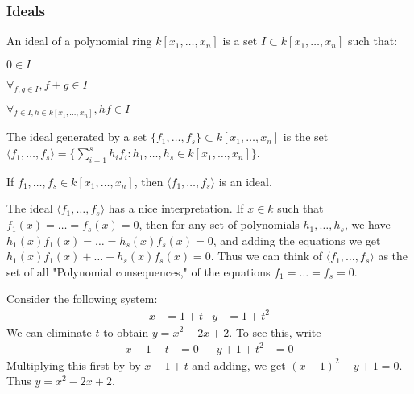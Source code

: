 \documentclass[crop=false,class=article,oneside]{standalone}
\begin{document}
    \subsubsection{Ideals}
    \begin{definition}
    An ideal of a polynomial ring $k[x_1,\hdots ,x_n]$ is a set $I\subset k[x_1,\hdots ,x_n]$ such that:
    \begin{enumerate}
    \begin{multicols}{3}
        \item $0\in I$
        \item $\forall_{f,g\in I}, f+g\in I$ 
        \item $\forall_{f\in I, h\in k[x_1,\hdots ,x_n]}, hf\in I$
    \end{multicols}
    \end{enumerate}
    \end{definition}
    \begin{definition}
    The ideal generated by a set $\{f_1,\hdots, f_s\} \subset k[x_1,\hdots ,x_n]$ is the set $\langle f_1,\hdots, f_s\rangle = \{\sum_{i=1}^{s} h_i f_i:h_1,\hdots, h_s\in k[x_1,\hdots ,x_n]\}$.
    \end{definition}
    \begin{theorem}
    If $f_1,\hdots, f_s\in k[x_1,\hdots ,x_n]$, then $\langle f_1,\hdots, f_s\rangle$ is an ideal.
    \end{theorem}
    \begin{remark}
    The ideal $\langle f_1,\hdots, f_s\rangle$ has a nice interpretation. If $x\in k$ such that $f_1(x) = \hdots = f_s(x) = 0$, then for any set of polynomials $h_1,\hdots, h_s$, we have $h_1(x)f_1(x) = \hdots = h_s(x)f_s(x) = 0$, and adding the equations we get $h_1(x)f_1(x)+\hdots + h_s(x)f_s(x) = 0$. Thus we can think of $\langle f_1,\hdots, f_s\rangle$ as the set of all "Polynomial consequences," of the equations $f_1 = \hdots = f_s = 0$.
    \end{remark}
    \begin{example}
    Consider the following system:
    \begin{align*}
        x&=1+t&y&=1+t^{2}
    \end{align*}
    We can eliminate $t$ to obtain $y = x^2-2x+2$. To see this, write
    \begin{align*}
        x-1-t&=0&-y+1+t^{2}&=0
    \end{align*}
    Multiplying this first by by $x-1+t$ and adding, we get $(x-1)^2-y+1 = 0$. Thus $y = x^2-2x+2$.
    \end{example}
\end{document}
